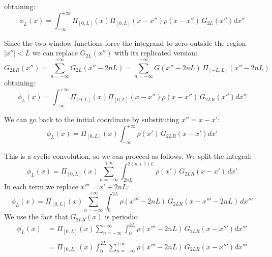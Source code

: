 obtaining:
\begin{equation}
\phi_L(x) = 
\int_{-\infty}^{+\infty} 
\Pi_{[0,L]}\left({x}\right)
\Pi_{[0,L]}\left({x-x''}\right)
\rho(x-x'')\,G_{2L}(x'') dx''
\label{eq:conv2}
\end{equation}

Since the two window functions force the integrand to zero outside the region $|x''|<L$ we can replace $G_{2L}(x'')$ with its replicated version:
\begin{equation}
G_{2LR}(x'') = \sum_{n=-\infty}^{+\infty}G_{2L}(x''-2nL) = \sum_{n=-\infty}^{+\infty}G(x'' -2nL)\,\Pi_{[-L,L]}
\left(
{x''-2nL}
\right)
\label{eq:GLR}
\end{equation}
obtaining:
\begin{equation}
\phi_L(x) = 
\int_{-\infty}^{+\infty} 
\Pi_{[0,L]}\left({x}\right)
\Pi_{[0,L]}\left({x-x''}\right)
\rho(x-x'')\,G_{2LR}(x'') dx''
\end{equation}

We can go back to the initial coordinate by substituting $x'' = x-x'$:
\begin{equation}
\phi_L(x) = 
\Pi_{[0,L]}\left(x\right)
\int_{-\infty}^{+\infty} 
\rho(x')\,G_{2LR}(x-x') dx'
\end{equation}

This is a cyclic convolution, so we can proceed as follows. We split the integral:
\begin{equation}
\phi_L(x) = 
\Pi_{[0,L]}\left({x}\right)
\sum_{n=-\infty}^{+\infty}
\int_{2nL}^{2(n+1)L} 
\rho(x')\,G_{2LR}(x-x') \,dx'
\label{eq:conv3}
\end{equation}
In each term we replace $x''' = x'+2nL$:
\begin{equation}
\phi_L(x) = 
\Pi_{[0,L]}\left({x}\right)
\sum_{n=-\infty}^{+\infty}
\int_{0 }^{2L} 
\rho(x'''-2nL)\,G_{2LR}(x-x'''-2nL) \,dx'''
\label{eq:conv4}
\end{equation}
We use the fact that $G_{2LR}(x)$ is periodic:
\begin{equation}
\begin{split}
\phi_L(x) &= 
\Pi_{[0,L]}\left({x}\right)
\sum_{n=-\infty}^{+\infty}
\int_{0 }^{2L} 
\rho(x'''-2nL)\,G_{2LR}(x-x''') dx'''\\
\\&=
\Pi_{[0,L]}\left({x}\right)
\int_{0 }^{2L}  
\sum_{n=-\infty}^{+\infty}
\rho(x'''-2nL)\,G_{2LR}(x-x''') dx'''
\end{split}
\label{eq:conv5}
\end{equation}

